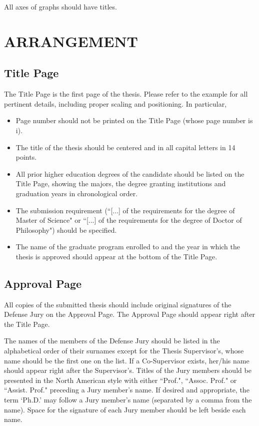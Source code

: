 \documentclass[a4paper,oneside,12pt]{report}
\numberwithin{equation}{chapter}
\begin{document}
All axes of graphs should have titles.



\chapter{ARRANGEMENT}



\section{Title Page}
The Title Page is the first page of the thesis. Please refer to the example for all pertinent details, including proper scaling and positioning. In particular,
\begin{itemize}
\item Page number should not be printed on the Title Page (whose page number is i).
\item The title of the thesis should be centered and in all capital letters in 14 points.
\item All prior higher education degrees of the candidate should be listed on the Title Page, showing the majors, the degree granting institutions and
graduation years in chronological order.
\item The submission requirement (``[...] of the requirements for the degree of Master of Science" or ``[...] of the requirements for the degree of Doctor of Philosophy") should be specified.
\item The name of the graduate program enrolled to and the year in which the thesis is approved should appear at the bottom of the Title Page.
\end{itemize}


\section{Approval Page}
All copies of the submitted thesis should include original signatures
of the Defense Jury on the Approval Page. The Approval Page should appear right after the Title Page.

The names of the members of the Defense Jury
should be listed in the alphabetical order of their surnames except for the
Thesis Supervisor's, whose name should be the first one on the list. If a Co-Supervisor exists, her/his name should appear right after the Supervisor's.
Titles of the Jury members should be presented in the North American
style with either ``Prof.",  ``Assoc. Prof." or ``Assist. Prof." preceding a Jury
member's name. If desired and appropriate, the term `Ph.D.' may follow
a Jury member's name (separated by a comma from the name). Space for the
signature of each Jury member should be left beside each name. 
\end{document}
